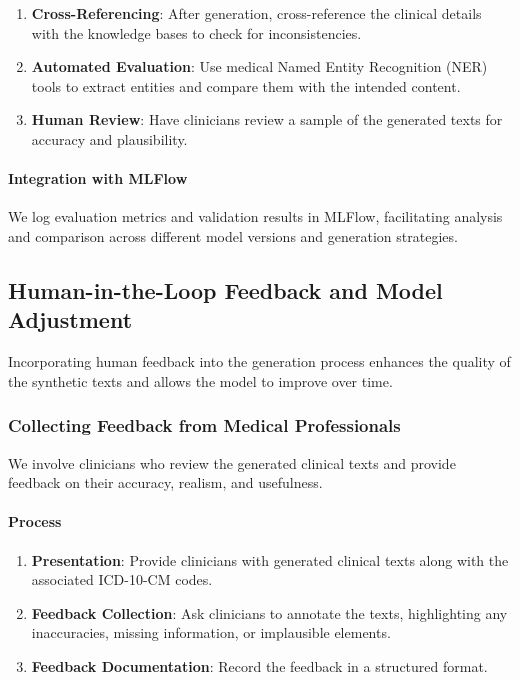 \documentclass[12pt, a4paper]{article}
\begin{document}
\begin{enumerate}
    \item \textbf{Cross-Referencing}: After generation, cross-reference the clinical details with the knowledge bases to check for inconsistencies.
    \item \textbf{Automated Evaluation}: Use medical Named Entity Recognition (NER) tools to extract entities and compare them with the intended content.
    \item \textbf{Human Review}: Have clinicians review a sample of the generated texts for accuracy and plausibility.
\end{enumerate}

\paragraph{Integration with MLFlow}

We log evaluation metrics and validation results in MLFlow, facilitating analysis and comparison across different model versions and generation strategies.

\subsection{Human-in-the-Loop Feedback and Model Adjustment}

Incorporating human feedback into the generation process enhances the quality of the synthetic texts and allows the model to improve over time.

\subsubsection{Collecting Feedback from Medical Professionals}

We involve clinicians who review the generated clinical texts and provide feedback on their accuracy, realism, and usefulness.

\paragraph{Process}

\begin{enumerate}
    \item \textbf{Presentation}: Provide clinicians with generated clinical texts along with the associated ICD-10-CM codes.
    \item \textbf{Feedback Collection}: Ask clinicians to annotate the texts, highlighting any inaccuracies, missing information, or implausible elements.
    \item \textbf{Feedback Documentation}: Record the feedback in a structured format.
\end{enumerate}
\end{document}
